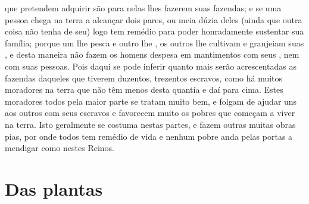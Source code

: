 que pretendem adquirir são  para nelas lhes fazerem suas \EP[-2]
fazendas; e se uma pessoa chega na terra a alcançar dois pares, ou meia
dúzia deles (ainda que outra coisa não tenha de seu) logo tem remédio
para poder honradamente sustentar sua família; porque um lhe pesca e				%
outro lhe , os outros lhe cultivam e granjeiam suas , e desta	%
maneira não fazem os homens despesa em mantimentos com seus ,
nem com suas pessoas. Pois daqui se pode inferir quanto mais serão
acrescentadas as fazendas daqueles que tiverem duzentos, trezentos
escravos, como há muitos moradores na terra que não têm menos desta
quantia e daí para cima. Estes moradores todos pela maior parte se
tratam muito bem, e folgam de ajudar uns aos outros com seus escravos e 
favorecem muito os pobres que começam a viver na terra. Isto geralmente				%
se costuma nestas partes, e fazem outras muitas obras pias, por onde
todos tem remédio de vida e nenhum pobre anda pelas portas a mendigar
como nestes Reinos.



\chapter[Das plantas, mantimentos e frutas]{Das
plantas}



